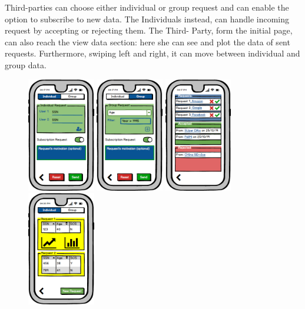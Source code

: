 \documentclass[a4paper]{article}
\begin{document}
Third-parties can choose either individual or group request and can enable the option to subscribe to new data. The Individuals instead, can handle incoming request by accepting or rejecting them. The Third- Party, form the initial page, can also reach the view data section: here she can see and plot the data of sent requests. Furthermore, swiping left and right, it can move between individual and group data.
\begin{figure}[!htpb]		
		
     	\centering		
     	\includegraphics[height=50mm]{images/mockups/Requests.png}		
     	\includegraphics[height=50mm]{images/mockups/GroupRequest.png}		
     	\includegraphics[height=50mm]{images/mockups/ManageRequests.png}		
     	\includegraphics[height=50mm]{images/mockups/ViewData.png}		

\end{figure}
\end{document}
